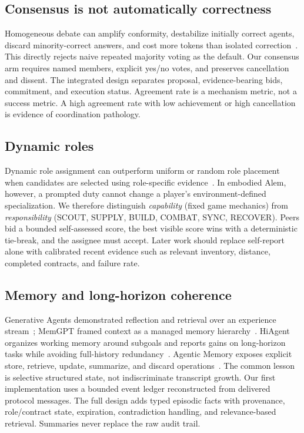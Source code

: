 \documentclass[11pt]{article}
\begin{document}
\subsection{Consensus is not automatically correctness}
Homogeneous debate can amplify conformity, destabilize initially correct agents, discard minority-correct answers, and cost more tokens than isolated correction~\citep{costconsensus2026}. This directly rejects naive repeated majority voting as the default. Our consensus arm requires named members, explicit yes/no votes, and preserves cancellation and dissent. The integrated design separates proposal, evidence-bearing bids, commitment, and execution status. Agreement rate is a mechanism metric, not a success metric. A high agreement rate with low achievement or high cancellation is evidence of coordination pathology.

\subsection{Dynamic roles}
Dynamic role assignment can outperform uniform or random role placement when candidates are selected using role-specific evidence~\citep{dynamicroles2026}. In embodied Alem, however, a prompted duty cannot change a player's environment-defined specialization. We therefore distinguish \emph{capability} (fixed game mechanics) from \emph{responsibility} (SCOUT, SUPPLY, BUILD, COMBAT, SYNC, RECOVER). Peers bid a bounded self-assessed score, the best visible score wins with a deterministic tie-break, and the assignee must accept. Later work should replace self-report alone with calibrated recent evidence such as relevant inventory, distance, completed contracts, and failure rate.

\subsection{Memory and long-horizon coherence}
Generative Agents demonstrated reflection and retrieval over an experience stream~\citep{generativeagents2023}; MemGPT framed context as a managed memory hierarchy~\citep{memgpt2023}. HiAgent organizes working memory around subgoals and reports gains on long-horizon tasks while avoiding full-history redundancy~\citep{hiagent2025}. Agentic Memory exposes explicit store, retrieve, update, summarize, and discard operations~\citep{agemem2026}. The common lesson is selective structured state, not indiscriminate transcript growth. Our first implementation uses a bounded event ledger reconstructed from delivered protocol messages. The full design adds typed episodic facts with provenance, role/contract state, expiration, contradiction handling, and relevance-based retrieval. Summaries never replace the raw audit trail.
\end{document}
